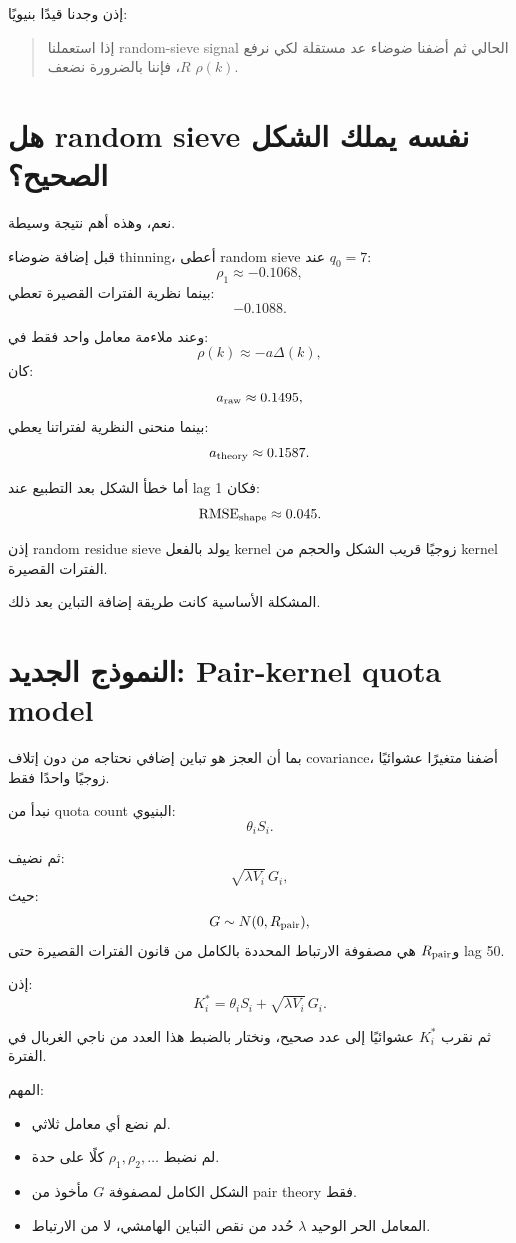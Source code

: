 \documentclass[12pt]{article}
\begin{document}
إذن وجدنا قيدًا بنيويًا:

\begin{quote}
إذا استعملنا random-sieve signal الحالي ثم أضفنا ضوضاء عد مستقلة
لكي نرفع \(R\)، فإننا بالضرورة نضعف \(\rho(k)\).
\end{quote}

\section{هل random sieve نفسه يملك الشكل الصحيح؟}

نعم، وهذه أهم نتيجة وسيطة.

قبل إضافة ضوضاء thinning، أعطى random sieve عند \(q_0=7\):
\[
\rho_1\approx-0.1068,
\]
بينما نظرية الفترات القصيرة تعطي:
\[
-0.1088.
\]

وعند ملاءمة معامل واحد فقط في:
\[
\rho(k)\approx-a\Delta(k),
\]
كان:
\[
a_{\rm raw}\approx0.1495,
\]
بينما منحنى النظرية لفتراتنا يعطي:
\[
a_{\rm theory}\approx0.1587.
\]

أما خطأ الشكل بعد التطبيع عند lag 1 فكان:
\[
\mathrm{RMSE}_{\rm shape}\approx0.045.
\]

إذن random residue sieve يولد بالفعل kernel زوجيًا قريب الشكل والحجم
من kernel الفترات القصيرة.

المشكلة الأساسية كانت طريقة إضافة التباين بعد ذلك.

\section{النموذج الجديد: Pair-kernel quota model}

بما أن العجز هو تباين إضافي نحتاجه من دون إتلاف covariance،
أضفنا متغيرًا عشوائيًا زوجيًا واحدًا فقط.

نبدأ من quota count البنيوي:
\[
\theta_iS_i.
\]

ثم نضيف:
\[
\sqrt{\lambda V_i}\,G_i,
\]
حيث:
\[
G\sim N(0,R_{\rm pair}),
\]
و\(R_{\rm pair}\) هي مصفوفة الارتباط المحددة بالكامل من قانون الفترات القصيرة
حتى lag 50.

إذن:
\[
K_i^\ast
=
\theta_iS_i
+
\sqrt{\lambda V_i}\,G_i.
\]

ثم نقرب \(K_i^\ast\) عشوائيًا إلى عدد صحيح، ونختار بالضبط هذا العدد من
ناجي الغربال في الفترة.

المهم:

\begin{itemize}
\item لم نضع أي معامل ثلاثي.
\item لم نضبط \(\rho_1,\rho_2,\ldots\) كلًا على حدة.
\item الشكل الكامل لمصفوفة \(G\) مأخوذ من pair theory فقط.
\item المعامل الحر الوحيد \(\lambda\) حُدد من نقص التباين الهامشي، لا من الارتباط.
\end{itemize}
\end{document}
